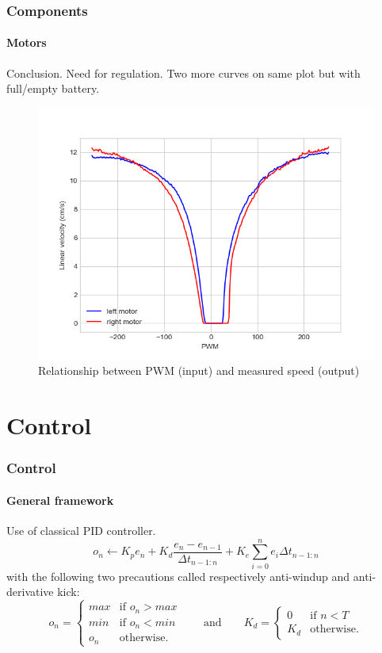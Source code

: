 \documentclass{beamer}
\begin{document}

\begin{frame}
\frametitle{Components}
\framesubtitle{Motors}
Conclusion. Need for regulation. Two more curves on same plot but with full/empty battery.
\begin{figure}[hbtp]
\centering
\includegraphics[scale=0.4]{figures/motors.png}
\caption{Relationship between PWM (input) and measured speed (output)}
\end{figure}

\end{frame}


\section{Control} 

\begin{frame}
\frametitle{Control}
\framesubtitle{General framework}
Use of classical PID controller.
$$ 
o_n \leftarrow K_p e_n + K_d\frac{e_n - e_{n-1}}{\Delta t_{n-1:n}} + K_e\sum_{i=0}^{n}{e_i \Delta t_{n-1:n}}
$$
with the following two precautions called respectively anti-windup and anti-derivative kick:
$$
o_n = \left\{
    \begin{array}{ll}
        max & \mbox{if } o_n > max \\
        min & \mbox{if } o_n < min \\
        o_n & \mbox{otherwise.}
    \end{array}
\right.
\qquad\text{and}\qquad	
K_d = \left\{
    \begin{array}{ll}
        0 & \mbox{if } n < T \\
       K_d & \mbox{otherwise.}
    \end{array}
\right.
$$
\end{frame}
\end{document}

